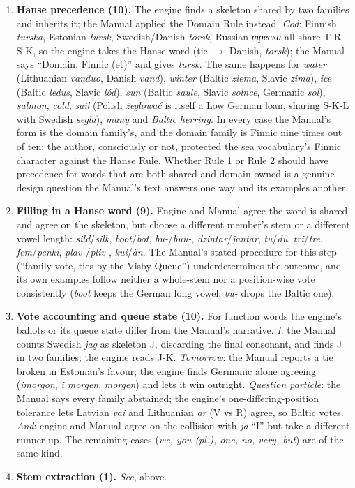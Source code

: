 \begin{enumerate}
\item \textbf{Hanse precedence (10).} The engine finds a skeleton shared by two families and inherits it; the Manual applied the Domain Rule instead. \emph{Cod}: Finnish \emph{turska}, Estonian \emph{tursk}, Swedish/Danish \emph{torsk}, Russian \emph{треска} all share T-R-S-K, so the engine takes the Hanse word (tie $\rightarrow$ Danish, \emph{torsk}); the Manual says ``Domain: Finnic (et)'' and gives \emph{tursk}. The same happens for \emph{water} (Lithuanian \emph{vanduo}, Danish \emph{vand}), \emph{winter} (Baltic \emph{ziema}, Slavic \emph{zima}), \emph{ice} (Baltic \emph{ledus}, Slavic \emph{lód}), \emph{sun} (Baltic \emph{saule}, Slavic \emph{solnce}, Germanic \emph{sol}), \emph{salmon}, \emph{cold}, \emph{sail} (Polish \emph{żeglować} is itself a Low German loan, sharing S-K-L with Swedish \emph{segla}), \emph{many} and \emph{Baltic herring}. In every case the Manual's form is the domain family's, and the domain family is Finnic nine times out of ten: the author, consciously or not, protected the sea vocabulary's Finnic character against the Hanse Rule. Whether Rule 1 or Rule 2 should have precedence for words that are both shared and domain-owned is a genuine design question the Manual's text answers one way and its examples another.
\item \textbf{Filling in a Hanse word (9).} Engine and Manual agree the word is shared and agree on the skeleton, but choose a different member's stem or a different vowel length: \emph{sild}/\emph{silk}, \emph{boot}/\emph{bot}, \emph{bu-}/\emph{buu-}, \emph{dzintar}/\emph{jantar}, \emph{tu}/\emph{du}, \emph{tri}/\emph{tre}, \emph{fem}/\emph{penki}, \emph{plav-}/\emph{pliv-}, \emph{kui}/\emph{än}. The Manual's stated procedure for this step (``family vote, ties by the Visby Queue'') underdetermines the outcome, and its own examples follow neither a whole-stem nor a position-wise vote consistently (\emph{boot} keeps the German long vowel; \emph{bu-} drops the Baltic one).
\item \textbf{Vote accounting and queue state (10).} For function words the engine's ballots or its queue state differ from the Manual's narrative. \emph{I}: the Manual counts Swedish \emph{jag} as skeleton J, discarding the final consonant, and finds J in two families; the engine reads J-K. \emph{Tomorrow}: the Manual reports a tie broken in Estonian's favour; the engine finds Germanic alone agreeing (\emph{imorgon}, \emph{i morgen}, \emph{morgen}) and lets it win outright. \emph{Question particle}: the Manual says every family abstained; the engine's one-differing-position tolerance lets Latvian \emph{vai} and Lithuanian \emph{ar} (V vs R) agree, so Baltic votes. \emph{And}: engine and Manual agree on the collision with \emph{ja} ``I'' but take a different runner-up. The remaining cases (\emph{we, you (pl.), one, no, very, but}) are of the same kind.
\item \textbf{Stem extraction (1).} \emph{See}, above.
\end{enumerate}

